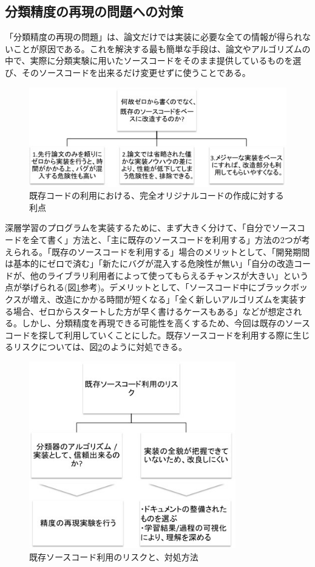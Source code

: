 \subsection{分類精度の再現の問題への対策}
「分類精度の再現の問題」は、論文だけでは実装に必要な全ての情報が得られないことが原因である。これを解決する最も簡単な手段は、論文やアルゴリズムの中で、実際に分類実験に用いたソースコードをそのまま提供しているものを選び、そのソースコードを出来るだけ変更せずに使うことである。
\begin{figure}[tbp]
 \begin{center}
  \includegraphics[width=120mm]{img/c4/library_merit}
 \end{center}
 \caption{既存コードの利用における、完全オリジナルコードの作成に対する利点}
 \label{c4_library_merit}
\end{figure}
深層学習のプログラムを実装するために、まず大きく分けて、「自分でソースコードを全て書く」方法と、「主に既存のソースコードを利用する」方法の2つが考えられる。「既存のソースコードを利用する」場合のメリットとして、「開発期間は基本的にゼロで済む」「新たにバグが混入する危険性が無い」「自分の改造コードが、他のライブラリ利用者によって使ってもらえるチャンスが大きい」という点が挙げられる(図\ref{c4_library_merit}参考)。デメリットとして、「ソースコード中にブラックボックスが増え、改造にかかる時間が短くなる」「全く新しいアルゴリズムを実装する場合、ゼロからスタートした方が早く書けるケースもある」などが想定される。しかし、分類精度を再現できる可能性を高くするため、今回は既存のソースコードを探して利用していくことにした。既存ソースコードを利用する際に生じるリスクについては、図\ref{c4_library_hedge}のように対処できる。\par
\begin{figure}[tbp]
 \begin{center}
  \includegraphics[width=90mm]{img/c4/library_hedge}
 \end{center}
 \caption{既存ソースコード利用のリスクと、対処方法}
 \label{c4_library_hedge}
\end{figure}
